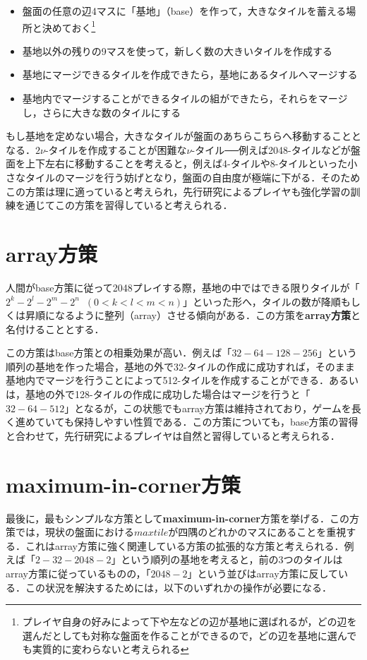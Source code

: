 \documentclass{suribt}
\begin{document}
\begin{itemize}
\item 盤面の任意の辺4マスに「基地」（base）を作って，大きなタイルを蓄える場所と決めておく\footnote{プレイヤ自身の好みによって下や左などの辺が基地に選ばれるが，どの辺を選んだとしても対称な盤面を作ることができるので，どの辺を基地に選んでも実質的に変わらないと考えられる}
\item 基地以外の残りの9マスを使って，新しく数の大きいタイルを作成する
\item 基地にマージできるタイルを作成できたら，基地にあるタイルへマージする
\item 基地内でマージすることができるタイルの組ができたら，それらをマージし，さらに大きな数のタイルにする
\end{itemize}

もし基地を定めない場合，大きなタイルが盤面のあちらこちらへ移動することとなる．$2{\nu}$-タイルを作成することが困難な${\nu}$-タイル──例えば2048-タイルなどが盤面を上下左右に移動することを考えると，例えば4-タイルや8-タイルといった小さなタイルのマージを行う妨げとなり，盤面の自由度が極端に下がる．そのためこの方策は理に適っていると考えられ，先行研究によるプレイヤも強化学習の訓練を通じてこの方策を習得していると考えられる．

\section{array方策}
人間がbase方策に従って2048プレイする際，基地の中ではできる限りタイルが「$2^{k}-2^{l}-2^{m}-2^{n} \;\; (0<k<l<m<n)$」といった形へ，タイルの数が降順もしくは昇順になるように整列（array）させる傾向がある．この方策を\textbf{array方策}と名付けることとする．

この方策はbase方策との相乗効果が高い．例えば「$32-64-128-256$」という順列の基地を作った場合，基地の外で32-タイルの作成に成功すれば，そのまま基地内でマージを行うことによって512-タイルを作成することができる．あるいは，基地の外で128-タイルの作成に成功した場合はマージを行うと「$32-64-512$」となるが，この状態でもarray方策は維持されており，ゲームを長く進めていても保持しやすい性質である．この方策についても，base方策の習得と合わせて，先行研究によるプレイヤは自然と習得していると考えられる．

\section{maximum-in-corner方策}
最後に，最もシンプルな方策として\textbf{maximum-in-corner}方策を挙げる．この方策では，現状の盤面における$max tile$が四隅のどれかのマスにあることを重視する．これはarray方策に強く関連している方策の拡張的な方策と考えられる．例えば「$2-32-2048-2$」という順列の基地を考えると，前の3つのタイルはarray方策に従っているものの，「$2048-2$」という並びはarray方策に反している．この状況を解決するためには，以下のいずれかの操作が必要になる．
\end{document}
